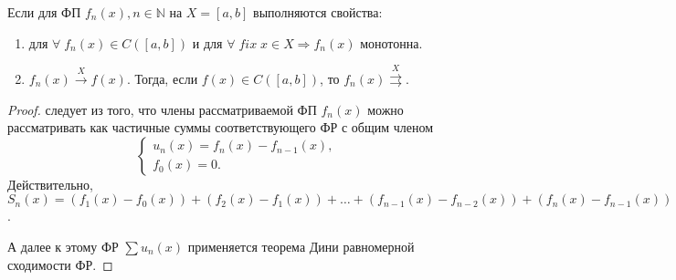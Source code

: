 \begin{consequence}
	Если для ФП $f_n(x), n \in \mathbb{N}$ на $X = [a,b]$ выполняются свойства:
	\begin{enumerate}
		\item для $\forall \; f_n(x) \in C([a,b])$ и для	 $\forall \; fix \; x \in X \Rightarrow f_n(x)$ монотонна.
		\item $f_n(x) 	\overset{X}{\longrightarrow}f(x)$. Тогда, если $f(x) \in C([a,b])$, то $f_n(x) \overset{X}{\rightrightarrows}$.
	\end{enumerate}
\end{consequence}
\begin{proof}
	следует из того, что члены рассматриваемой ФП $f_n(x)$ можно рассматривать как частичные суммы соответствующего ФР с общим членом
	\begin{equation}
	\label{eq:1_27}
	\begin{cases}
	u_n(x) = f_n(x) - f_{n-1}(x),\\
	f_0(x) = 0.
	\end{cases}
	\end{equation}
	Действительно, $S_n(x) = (f_1(x) - f_0(x)) + (f_2(x) - f_1(x)) + \ldots + (f_{n-1}(x) - f_{n-2}(x)) + (f_n(x) - f_{n-1}(x)) = f_n(x) - f_0(x) = f_n(x), \text{ для } \forall \; n \in \mathbb{N}$.

	А далее к этому ФР $\sum{ u_n(x)}$ применяется теорема Дини равномерной сходимости ФР.
\end{proof}
